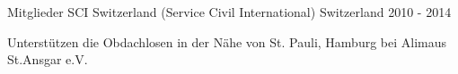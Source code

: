 \begin{cventries}

\cventry
	{Mitglieder} %
	{SCI Switzerland (Service Civil International)} %
	{Switzerland} %
	{2010 - 2014} %
	{
		\begin{cvitems} %
			\item {Unterstützen die Obdachlosen in der Nähe von St. Pauli, Hamburg bei Alimaus St.Ansgar e.V.}
		\end{cvitems}
	}



\end{cventries}
